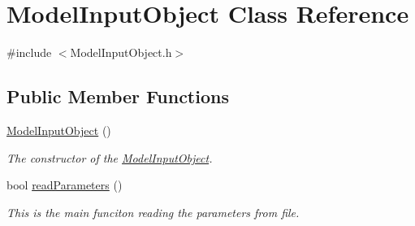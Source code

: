 \hypertarget{classModelInputObject}{}\section{Model\+Input\+Object Class Reference}
\label{classModelInputObject}


{\ttfamily \#include $<$Model\+Input\+Object.\+h$>$}

\subsection*{Public Member Functions}
\begin{DoxyCompactItemize}
\item 
\hypertarget{classModelInputObject_a64b031469546b19177c0a13365058162}{}\hyperlink{classModelInputObject_a64b031469546b19177c0a13365058162}{Model\+Input\+Object} ()\label{classModelInputObject_a64b031469546b19177c0a13365058162}

\begin{DoxyCompactList}\small\item\em The constructor of the \hyperlink{classModelInputObject}{Model\+Input\+Object}. \end{DoxyCompactList}\item 
bool \hyperlink{classModelInputObject_a9741685527f446bd2bf66455c5b01d0c}{read\+Parameters} ()
\begin{DoxyCompactList}\small\item\em This is the main funciton reading the parameters from file. \end{DoxyCompactList}\end{DoxyCompactItemize}
